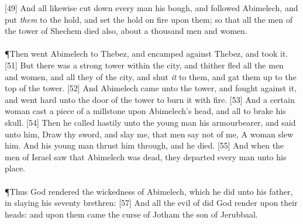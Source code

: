 [49] \textcolor[cmyk]{0.99998,1,0,0}{And all  likewise cut down every man his bough, and followed Abimelech, and put \emph{them} to the hold, and set the hold on fire upon them; so that all the men of the tower of Shechem died also, about a thousand men and women.}\\
\\
\P \textcolor[cmyk]{0.99998,1,0,0}{Then went Abimelech to Thebez, and encamped against Thebez, and took it.}
[51] \textcolor[cmyk]{0.99998,1,0,0}{But there was a strong tower within the city, and thither fled all the men and women, and all they of the city, and shut \emph{it} to them, and gat them up to the top of the tower.}
[52] \textcolor[cmyk]{0.99998,1,0,0}{And Abimelech came unto the tower, and fought against it, and went hard unto the door of the tower to burn it with fire.}
[53] \textcolor[cmyk]{0.99998,1,0,0}{And a certain woman cast a piece of a millstone upon Abimelech's head, and all to brake his skull.}
[54] \textcolor[cmyk]{0.99998,1,0,0}{Then he called hastily unto the young man his armourbearer, and said unto him, Draw thy sword, and slay me, that men say not of me, A woman slew him. And his young man thrust him through, and he died.}
[55] \textcolor[cmyk]{0.99998,1,0,0}{And when the men of Israel saw that Abimelech was dead, they departed every man unto his place.}\\
\\
\P \textcolor[cmyk]{0.99998,1,0,0}{Thus God rendered the wickedness of Abimelech, which he did unto his father, in slaying his seventy brethren:}
[57] \textcolor[cmyk]{0.99998,1,0,0}{And all the evil of  did God render upon their heads: and upon them came the curse of Jotham the son of Jerubbaal.}